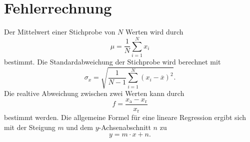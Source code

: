 \section{Fehlerrechnung}

Der Mittelwert einer Stichprobe von $N$ Werten wird durch
\begin{equation*}
    \mu = \frac{1}{N} \sum_{i=1}^N x_i
    \label{eqn:mittelwert}
\end{equation*}
bestimmt.
\newline
Die Standardabweichung der Stichprobe wird berechnet mit
\begin{equation*}
    \sigma_x = \sqrt{\frac{1}{N-1} \sum_{i=1}^N (x_i - \overline{x})^2}.
    \label{eqn:standard}
\end{equation*}
\newline
Die realtive Abweichung zwischen zwei Werten kann durch
\begin{equation*}
    f = \frac{x_\text{a} - x_\text{r}}{x_\text{r}}
\end{equation*}
bestimmt werden.
\newline 
Die allgemeine Formel für eine lineare Regression ergibt sich mit der Steigung $m$ und dem $y$-Achsenabschnitt $n$ zu 
\begin{equation}
    y = m \cdot x + n.
    \label{linReg}
\end{equation}